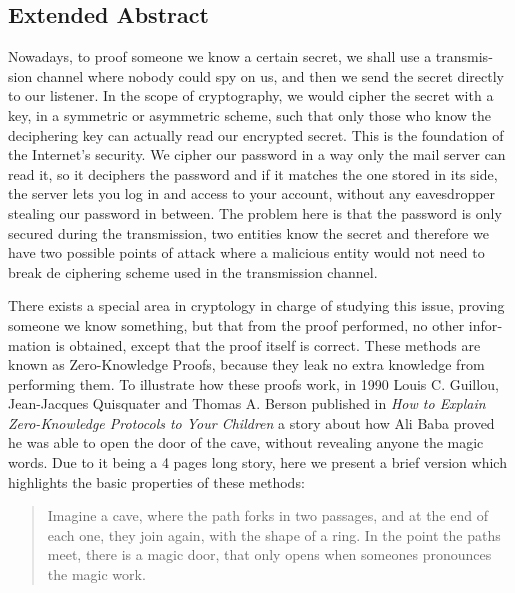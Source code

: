 
\begingroup
\let\clearpage\relax
\let\cleardoublepage\relax
\let\cleardoublepage\relax

\begin{otherlanguage}{english}
\chapter*{Extended Abstract}

Nowadays, to proof someone we know a certain secret, we shall use a transmission channel where nobody could spy on us, and then we send the secret directly to our listener. In the scope of cryptography, we would cipher the secret with a key, in a symmetric or asymmetric scheme, such that only those who know the deciphering key can actually read our encrypted secret. This is the foundation of the Internet's security. We cipher our password in a way only the mail server can read it, so it deciphers the password and if it matches the one stored in its side, the server lets you log in and access to your account, without any eavesdropper stealing our password in between. The problem here is that the password is only secured during the transmission, two entities know the secret and therefore we have two possible points of attack where a malicious entity would not need to break de ciphering scheme used in the transmission channel.

There exists a special area in cryptology in charge of studying this issue, proving someone we know something, but that from the proof performed, no other information is obtained, except that the proof itself is correct. These methods are known as Zero-Knowledge Proofs, because they leak no extra knowledge from performing them. To illustrate how these proofs work, in 1990 Louis C. Guillou, Jean-Jacques Quisquater and Thomas A. Berson published in \textit{How to Explain Zero-Knowledge Protocols to Your Children} \citep{ZKPcave:story} a story about how Ali Baba proved he was able to open the door of the cave, without revealing anyone the magic words. Due to it being a 4 pages long story, here we present a brief version which highlights the basic properties of these methods:

\hfil

\begin{quote}
	Imagine a cave, where the path forks in two passages, and at the end of each one, they join again, with the shape of a ring. In the point the paths meet, there is a magic door, that only opens when someones pronounces the magic work.
	

\end{quote}
\end{otherlanguage}
